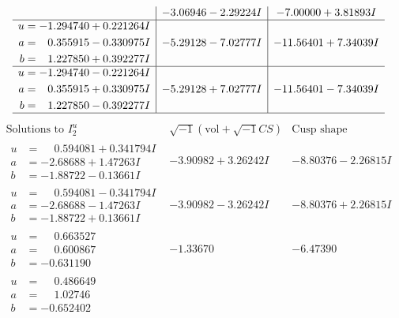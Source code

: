 \documentclass[1p]{elsarticle_modified}
\theoremstyle{definition}
\newcommand{\I}{\sqrt{-1}}
\begin{document}
$$\begin{array}{c|c|c}
 & -3.06946 - 2.29224 I & -7.00000 + 3.81893 I \\ \hline\begin{aligned}
u &= -1.294740 + 0.221264 I \\
a &= \phantom{-}0.355915 - 0.330975 I \\
b &= \phantom{-}1.227850 + 0.392277 I\end{aligned}
 & -5.29128 - 7.02777 I & -11.56401 + 7.34039 I \\ \hline\begin{aligned}
u &= -1.294740 - 0.221264 I \\
a &= \phantom{-}0.355915 + 0.330975 I \\
b &= \phantom{-}1.227850 - 0.392277 I\end{aligned}
 & -5.29128 + 7.02777 I & -11.56401 - 7.34039 I\\
 \hline 
 \end{array}$$\newpage$$\begin{array}{c|c|c}  
\text{Solutions to }I^u_{2}& \I (\text{vol} + \sqrt{-1}CS) & \text{Cusp shape}\\
 \hline 
\begin{aligned}
u &= \phantom{-}0.594081 + 0.341794 I \\
a &= -2.68688 + 1.47263 I \\
b &= -1.88722 - 0.13661 I\end{aligned}
 & -3.90982 + 3.26242 I & -8.80376 - 2.26815 I \\ \hline\begin{aligned}
u &= \phantom{-}0.594081 - 0.341794 I \\
a &= -2.68688 - 1.47263 I \\
b &= -1.88722 + 0.13661 I\end{aligned}
 & -3.90982 - 3.26242 I & -8.80376 + 2.26815 I \\ \hline\begin{aligned}
u &= \phantom{-}0.663527\phantom{ +0.000000I} \\
a &= \phantom{-}0.600867\phantom{ +0.000000I} \\
b &= -0.631190\phantom{ +0.000000I}\end{aligned}
 & -1.33670\phantom{ +0.000000I} & -6.47390\phantom{ +0.000000I} \\ \hline\begin{aligned}
u &= \phantom{-}0.486649\phantom{ +0.000000I} \\
a &= \phantom{-}1.02746\phantom{ +0.000000I} \\
b &= -0.652402\phantom{ +0.000000I}\end{aligned}

\end{array}$$
\end{document}
